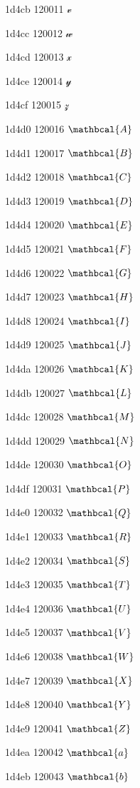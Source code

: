 \documentclass[11pt]{article}
\begin{document}
1d4cb 120011 \ensuremath{\mathscr{v}}

1d4cc 120012 \ensuremath{\mathscr{w}}

1d4cd 120013 \ensuremath{\mathscr{x}}

1d4ce 120014 \ensuremath{\mathscr{y}}

1d4cf 120015 \ensuremath{\mathscr{z}}

1d4d0 120016 \ensuremath{\mathbcal{A}}

1d4d1 120017 \ensuremath{\mathbcal{B}}

1d4d2 120018 \ensuremath{\mathbcal{C}}

1d4d3 120019 \ensuremath{\mathbcal{D}}

1d4d4 120020 \ensuremath{\mathbcal{E}}

1d4d5 120021 \ensuremath{\mathbcal{F}}

1d4d6 120022 \ensuremath{\mathbcal{G}}

1d4d7 120023 \ensuremath{\mathbcal{H}}

1d4d8 120024 \ensuremath{\mathbcal{I}}

1d4d9 120025 \ensuremath{\mathbcal{J}}

1d4da 120026 \ensuremath{\mathbcal{K}}

1d4db 120027 \ensuremath{\mathbcal{L}}

1d4dc 120028 \ensuremath{\mathbcal{M}}

1d4dd 120029 \ensuremath{\mathbcal{N}}

1d4de 120030 \ensuremath{\mathbcal{O}}

1d4df 120031 \ensuremath{\mathbcal{P}}

1d4e0 120032 \ensuremath{\mathbcal{Q}}

1d4e1 120033 \ensuremath{\mathbcal{R}}

1d4e2 120034 \ensuremath{\mathbcal{S}}

1d4e3 120035 \ensuremath{\mathbcal{T}}

1d4e4 120036 \ensuremath{\mathbcal{U}}

1d4e5 120037 \ensuremath{\mathbcal{V}}

1d4e6 120038 \ensuremath{\mathbcal{W}}

1d4e7 120039 \ensuremath{\mathbcal{X}}

1d4e8 120040 \ensuremath{\mathbcal{Y}}

1d4e9 120041 \ensuremath{\mathbcal{Z}}

1d4ea 120042 \ensuremath{\mathbcal{a}}

1d4eb 120043 \ensuremath{\mathbcal{b}}
\end{document}
